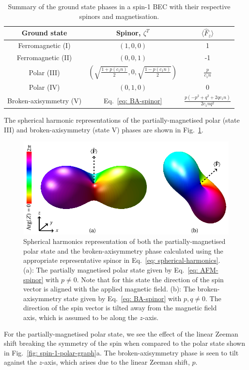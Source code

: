 \begin{table}
    \centering
    \begin{tabular}{ccc}
        \toprule
        Ground state & Spinor, \(\zeta^T\) & \(\langle\hat{F}_z\rangle\) \\
        \midrule
        Ferromagnetic (I) & \((1, 0, 0)\) & 1 \\
        Ferromagnetic (II) & \((0, 0, 1)\) & -1 \\
        Polar (III) & \(\left(\sqrt{\frac{1 + p(c_1n)}{2}}, 0,
        \sqrt{\frac{1 - p(c_1n)}{2}}\right)\) & \(\frac{p}{c_1n}\) \\
        Polar (IV) & \((0, 1, 0)\) & 0 \\
        Broken-axisymmetry (V) & Eq.~\eqref{eq: BA-spinor} &
        \(\frac{p(-p^2+q^2+2qc_1n)}{2c_1nq^2}\) \\
        \bottomrule
    \end{tabular}
    \caption[Ground states arising in spin-1 BECs in the presence of magnetic
    fields]
    {\label{tab: spin-1-ground-states}Summary of the ground state phases in a
    spin-1 BEC with their respective spinors and magnetisation.}
\end{table}

The spherical harmonic representations of the partially-magnetised polar
(state III) and broken-axisymmetry (state V) phases are shown in
Fig.~\ref{fig: spin-1-magnetised-graph}.
\begin{figure}
    \includegraphics[height=0.4\textwidth, width=\textwidth]
    {gfx/ch-groundStateSymmetries/spin-1-magnetised.pdf}
    \caption[Spherical harmonic representation of spin-1 ground states]
    {\label{fig: spin-1-magnetised-graph}
    Spherical harmonics representation of both the partially-magnetised polar
    state and the broken-axisymmetry phase calculated using the appropriate
    representative spinor in Eq.~\eqref{eq: spherical-harmonics}.
    (a): The partially magnetised polar state given by
    Eq.~\eqref{eq: AFM-spinor} with \(p \neq 0\).
    Note that for this state the direction of the spin vector is aligned with
    the applied magnetic field.
    (b): The broken-axisymmetry state given by Eq.~\eqref{eq: BA-spinor} with
    \(p, q \neq 0\).
    The direction of the spin vector is tilted away from the magnetic field
    axis, which is assumed to be along the \(z\)-axis.}
\end{figure}
For the partially-magnetised polar state, we see the effect of the linear
Zeeman shift breaking the symmetry of the spin when compared to the polar state
shown in Fig.~\ref{fig: spin-1-polar-graph}a.
The broken-axisymmetry phase is seen to tilt against the \(z\)-axis, which
arises due to the linear Zeeman shift, \(p\).

